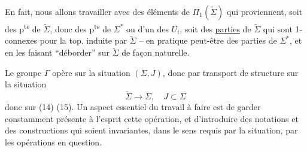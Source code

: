 En fait, nous allons travailler avec des éléments de $\Pi_1(\widetilde\Sigma)$ qui proviennent, soit des p\textsuperscript{ts} de $\widetilde\Sigma$, donc des p\textsuperscript{ts} de $\Sigma^*$ ou d'un des $U_i$, soit des \uline{parties} de $\widetilde\Sigma$ qui sont 1-connexes pour la top. induite par $\widetilde\Sigma$ -- en pratique peut-être des parties  de $\Sigma^*$, et en les faisant ``déborder'' sur $\widetilde\Sigma$ de façon naturelle.

Le groupe $\Gamma$ opère sur la situation  $(\Sigma,J)$, donc par transport de structure sur la situation
\[
\widetilde\Sigma\longrightarrow\Sigma,\quad J\subset\Sigma
\]
donc sur  (14) (15). Un aspect essentiel du travail à faire est de garder  constamment présente à l'esprit cette opération, et d'introduire des notations et des constructions qui soient invariantes, dans le sens requis par la situation, par les opérations en question.
